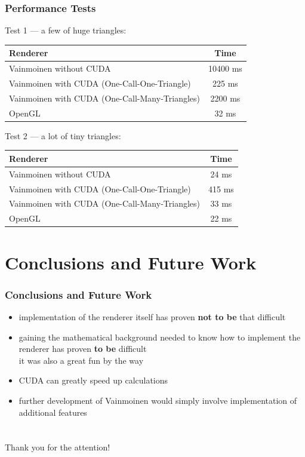 \documentclass[ignorenonframetext,handout,english]{beamer}
\begin{document}
\frame
{
	\frametitle{Performance Tests}
	{
		\pause

		Test 1 --- a few of huge triangles:

		\begin{center}
			\begin{tabular}{| l | c |}
			\hline
			\textbf{Renderer} & \textbf{Time} \\ \hline \hline
			Vainmoinen without CUDA & 10400 ms \\ \hline
			Vainmoinen with CUDA (One-Call-One-Triangle) & 225 ms \\ \hline
			Vainmoinen with CUDA (One-Call-Many-Triangles) & 2200 ms \\ \hline
			OpenGL & 32 ms \\ \hline
			\end{tabular}
		\end{center}

		\pause

		Test 2 --- a lot of tiny triangles:

		\begin{center}
			\begin{tabular}{| l | c |}
			\hline
			\textbf{Renderer} & \textbf{Time} \\ \hline \hline
			Vainmoinen without CUDA & 24 ms \\ \hline
			Vainmoinen with CUDA (One-Call-One-Triangle) & 415 ms \\ \hline
			Vainmoinen with CUDA (One-Call-Many-Triangles) & 33 ms \\ \hline
			OpenGL & 22 ms \\ \hline
			\end{tabular}
		\end{center}
	}
}



\section{Conclusions and Future Work}

\frame
{
	\frametitle{Conclusions and Future Work}
	{
		\begin{itemize}
			\pause
			\item implementation of the renderer itself has proven \textbf{not to be} that difficult
			\pause
			\item gaining the mathematical background needed to know how to implement the renderer has proven \textbf{to be} difficult \\
			\pause
			it was also a great fun by the way
			\pause
			\item CUDA can greatly speed up calculations
			\pause
			\item further development of Vainmoinen would simply involve implementation of additional features
		\end{itemize}
	}
}



\section*{}

\frame
{
	Thank you for the attention!
}
\end{document}
